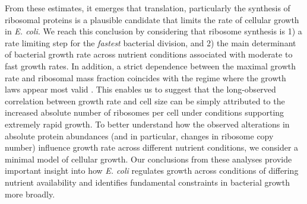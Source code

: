 
From these estimates, it emerges that translation,  particularly the synthesis of ribosomal proteins is a
plausible candidate that limits the rate of cellular growth in \textit{E. coli}.
We reach this conclusion by considering that ribosome synthesis is 1) a rate
limiting step for the \textit{fastest} bacterial division, and  2) the main
determinant of bacterial growth rate across  nutrient conditions associated with
moderate to fast growth rates. In addition, a strict dependence between the
maximal growth rate and ribosomal mass fraction coincides with the regime where
the growth laws appear most valid \citep{amir2017, scott2010}. This enables us
to suggest that the long-observed correlation between growth rate and cell size
\citep{schaechter1958, si2017} can be simply attributed to the increased
absolute number of ribosomes per cell under conditions supporting extremely
rapid growth. To better understand how the observed alterations in absolute
protein abundances (and in particular, changes in ribosome copy number)
influence growth rate across different nutrient conditions, we consider a minimal
model of cellular growth. Our conclusions from these analyses provide important
insight into how \textit{E. coli} regulates growth across conditions of
differing nutrient availability and identifies fundamental constraints in
bacterial growth more broadly.






\begin{figure}
\end{figure}
